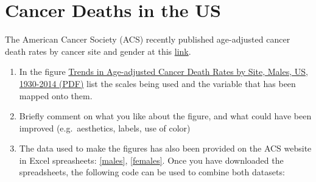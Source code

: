 \documentclass[letterpaper,9pt,twoside,printwatermark=false]{pinp}
\providecommand{\tightlist}{%
  \setlength{\itemsep}{0pt}\setlength{\parskip}{0pt}}
\begin{document}
\section{Cancer Deaths in the US}\label{cancer-deaths-in-the-us}

The American Cancer Society (ACS) recently published age-adjusted cancer
death rates by cancer site and gender at this
\href{https://www.cancer.org/research/cancer-facts-statistics/all-cancer-facts-figures/cancer-facts-figures-2017.html}{link}.

\begin{enumerate}
\def\labelenumi{\alph{enumi})}
\tightlist
\item
  In the figure
  \href{https://www.cancer.org/content/dam/cancer-org/research/cancer-facts-and-statistics/annual-cancer-facts-and-figures/2017/trends-in-age-adjusted-cancer-death-rates-by-site-males-us-1930-2014.pdf}{Trends
  in Age-adjusted Cancer Death Rates by Site, Males, US, 1930-2014
  (PDF)} list the scales being used and the variable that has been
  mapped onto them.
\item
  Briefly comment on what you like about the figure, and what could have
  been improved (e.g.~aesthetics, labels, use of color)
\item
  The data used to make the figures has also been provided on the ACS
  website in Excel spreasheets:
  \href{https://www.cancer.org/content/dam/cancer-org/research/cancer-facts-and-statistics/annual-cancer-facts-and-figures/2017/age-adjusted-cancer-death-rates-males-1930-2014.xlsx}{{[}males{]}},
  \href{https://www.cancer.org/content/dam/cancer-org/research/cancer-facts-and-statistics/annual-cancer-facts-and-figures/2017/age-adjusted-cancer-death-rates-females-1930-2014.xlsx}{{[}females{]}}.
  Once you have downloaded the spreadsheets, the following code can be
  used to combine both datasets:
\end{enumerate}

\begin{Shaded}
\end{Shaded}
\end{document}
